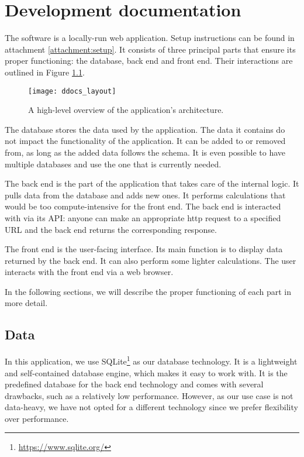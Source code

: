 \overfullrule=0pt
\chapter{Development documentation}

The software is a locally-run web application. Setup instructions can be found in attachment \ref{attachment:setup}.
It consists of three principal parts that ensure its proper functioning: the database, back end and
front end. Their interactions are outlined in Figure \ref{fig:architecture}.

\begin{figure}[!h]
\centering
\texttt{[image: ddocs\_layout]}
\caption{A high-level overview of the application's architecture.}
\label{fig:architecture}
\end{figure}

The database stores the data used by the application. The data it contains do not impact the functionality of the application. It can be added
to or removed from, as long as the added data follows the schema. It is even possible to have multiple databases and use the one that is currently needed.

The back end is the part of the application that takes care of the internal logic. It pulls data from the database and adds new ones. It performs calculations
that would be too compute-intensive for the front end. The back end is interacted with via its API: anyone can make an appropriate http request
to a specified URL and the back end returns the corresponding response.

The front end is the user-facing interface. Its main function is to display data returned by the back end. It can also perform some lighter calculations.
The user interacts with the front end via a web browser.

In the following sections, we will describe the proper functioning of each part in more detail.

\section{Data}

In this application, we use SQLite\footnote{\url{https://www.sqlite.org/}} as our data\-base technology. It is a lightweight and self-contained database engine,
which makes it easy to work with. It is the predefined database for the back end technology and comes with several drawbacks, such as a relatively low performance.
However, as our use case is not data-heavy, we have not opted for a different technology since we prefer flexibility over performance.

